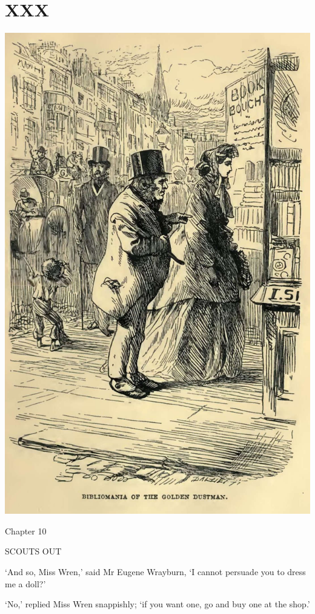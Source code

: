 
\chapter{XXX}

\includegraphics[scale=2.3]{03-05-01}

Chapter 10

SCOUTS OUT


‘And so, Miss Wren,’ said Mr Eugene Wrayburn, ‘I cannot persuade you to
dress me a doll?’

‘No,’ replied Miss Wren snappishly; ‘if you want one, go and buy one at
the shop.’

